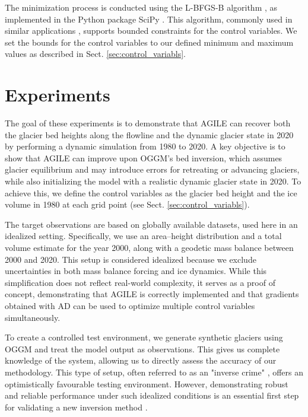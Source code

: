\documentclass[journal abbreviation, manuscript]{copernicus}
\begin{document}
The minimization process is conducted using the L-BFGS-B algorithm \citep{Byrd1995, Zhu1997, Morales2011}, as implemented in the \textsf{Python} package \textsf{SciPy} \citep[][\href{https://www.scipy.org/}{https://www.scipy.org/}]{2020SciPy-NMeth}. This algorithm, commonly used in similar applications \citep[e.g.,][]{Goldberg2013, Fuerst2017}, supports bounded constraints for the control variables. We set the bounds for the control variables to our defined minimum and maximum values as described in Sect. \ref{sec:control_variabls}.


\section{Experiments}
\label{sec:experiments}

The goal of these experiments is to demonstrate that AGILE can recover both the glacier bed heights along the flowline and the dynamic glacier state in 2020 by performing a dynamic simulation from 1980 to 2020. A key objective is to show that AGILE can improve upon OGGM’s bed inversion, which assumes glacier equilibrium and may introduce errors for retreating or advancing glaciers, while also initializing the model with a realistic dynamic glacier state in 2020. To achieve this, we define the control variables as the glacier bed height and the ice volume in 1980 at each grid point (see Sect. \ref{sec:control_variabls}).

The target observations are based on globally available datasets, used here in an idealized setting. Specifically, we use an area–height distribution and a total volume estimate for the year 2000, along with a geodetic mass balance between 2000 and 2020. This setup is considered idealized because we exclude uncertainties in both mass balance forcing and ice dynamics. While this simplification does not reflect real-world complexity, it serves as a proof of concept, demonstrating that AGILE is correctly implemented and that gradients obtained with AD can be used to optimize multiple control variables simultaneously.

To create a controlled test environment, we generate synthetic glaciers using OGGM and treat the model output as observations. This gives us complete knowledge of the system, allowing us to directly assess the accuracy of our methodology. This type of setup, often referred to as an "inverse crime" \citep{Colton2013}, offers an optimistically favourable testing environment. However, demonstrating robust and reliable performance under such idealized conditions is an essential first step for validating a new inversion method \citep{Goldberg2013}.
\end{document}
